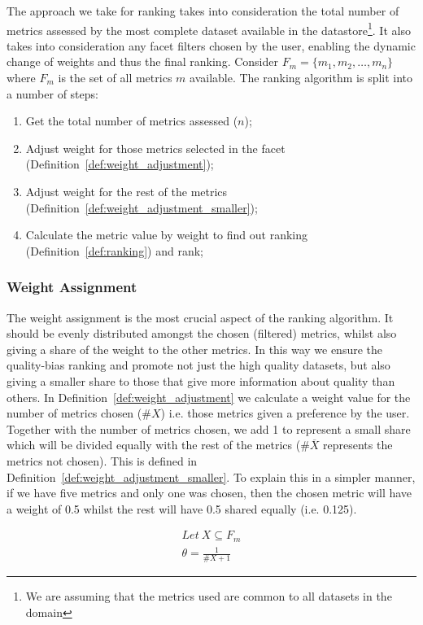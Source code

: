 The approach we take for ranking takes into consideration the total number of metrics assessed by the most complete dataset available in the datastore\footnote{We are assuming that the metrics used are common to all datasets in the domain}.
It also takes into consideration any facet filters chosen by the user, enabling the dynamic change of weights and thus the final ranking.
Consider $F_{m} = \lbrace m_{1},m_{2},\dots,m_{n} \rbrace$ where $F_{m}$ is the set of all metrics $m$ available.
The ranking algorithm is split into a number of steps:
\begin{enumerate}
\item Get the total number of metrics assessed ($n$);
\item Adjust weight for those metrics selected in the facet (Definition~\ref{def:weight_adjustment});
\item Adjust weight for the rest of the metrics (Definition~\ref{def:weight_adjustment_smaller});
\item Calculate the metric value by weight to find out ranking (Definition~\ref{def:ranking}) and rank;
\end{enumerate}

\subsubsection{Weight Assignment}
The weight assignment is the most crucial aspect of the ranking algorithm.
It should be evenly distributed amongst the chosen (filtered) metrics, whilst also giving a share of the weight to the other metrics.
In this way we ensure the quality-bias ranking and promote not just the high quality datasets, but also giving a smaller share to those that give more information about quality than others.
In Definition~\ref{def:weight_adjustment} we calculate a weight value for the number of metrics chosen ($\#X$) i.e. those metrics given a preference by the user.
Together with the number of metrics chosen, we add 1 to represent a small share which will be divided equally with the rest of the metrics ($\#\overline{X}$ represents the metrics not chosen).
This is defined in Definition~\ref{def:weight_adjustment_smaller}.
To explain this in a simpler manner, if we have five metrics and only one was chosen, then the chosen metric will have a weight of 0.5 whilst the rest will have 0.5 shared equally (i.e. 0.125).

\begin{Def1}
\label{def:weight_adjustment}
\begin{align*}
\mathit{Let}\ X \subseteq F_{m} \\
\theta = \frac{1}{\#X + 1}
\end{align*}
\end{Def1}

